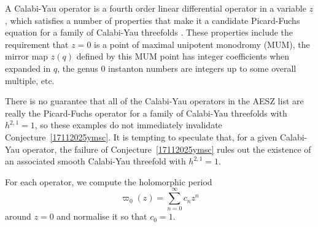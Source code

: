 \documentclass[11pt,leqno]{article}
\theoremstyle{remark}
\theoremstyle{definition}
\begin{document}
A Calabi-Yau operator is a fourth order linear differential operator in a variable $z$, which satisfies a number of properties that make it a candidate Picard-Fuchs equation for a family of Calabi-Yau threefolds \cite{alenstzu,almzud,vanStratenCYOperators}. These properties include the requirement that $z=0$ is a point of maximal unipotent monodromy (MUM), the mirror map $z(q)$ defined by this MUM point has integer coefficients when expanded in $q$, the genus $0$ instanton numbers are integers up to some overall multiple, etc.

There is no guarantee that all of the Calabi-Yau operators in the AESZ list \cite{alenstzu} are really the Picard-Fuchs operator for a family of Calabi-Yau threefolds with $h^{2,1}=1$, so these examples do not immediately invalidate Conjecture~\ref{17112025ymsc}. It is tempting to speculate that, for a given Calabi-Yau operator, the failure of Conjecture~\ref{17112025ymsc} rules out the existence of an associated smooth Calabi-Yau threefold with $h^{2,1}=1$.


For each operator, we compute the holomorphic period
\begin{equation*}
    \varpi_0(z) = \sum_{n=0}^{\infty}c_nz^n
\end{equation*}
around $z=0$ and normalise it so that $c_0=1$. 


\end{document}
